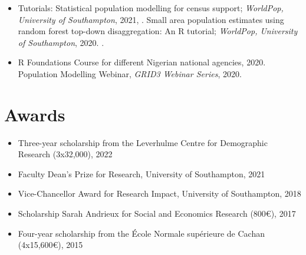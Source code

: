 \documentclass[
]{friggeri-cv}
\begin{document}
\begin{noside}
\begin{itemize}
\item  Tutorials: Statistical population modelling for census support; \textit{WorldPop, University of Southampton}, 2021, \href{https://wpgp.github.io/bottom-up-tutorial/}{\scriptsize{}}. Small area population estimates using random forest top-down disaggregation: An R tutorial;   \textit{WorldPop, University of Southampton}, 2020. \href{https://htmlpreview.github.io/?https://github.com/wpgp/top-down-tutorial/blob/master/4_tutorial.html#Suggested_Citation}{\scriptsize{}}.

\item R Foundations Course for different Nigerian national agencies, 2020. Population Modelling Webinar, \textit{GRID3 Webinar Series}, 2020. \href{https://www.youtube.com/watch?v=HMFM8HzLfH8}{\scriptsize{}}

\end{itemize}


\section{Awards}
\begin{itemize}
\item Three-year scholarship from the Leverhulme Centre for Demographic Research (3x32,000), 2022
\item Faculty Dean's Prize for Research, University of Southampton, 2021
\item Vice-Chancellor Award for Research Impact, University of Southampton, 2018
\item Scholarship Sarah Andrieux for Social and Economics Research (800€), 2017
\item Four-year scholarship from the École Normale supérieure de Cachan (4x15,600€), 2015
\end{itemize}
\end{noside}
\end{document}
